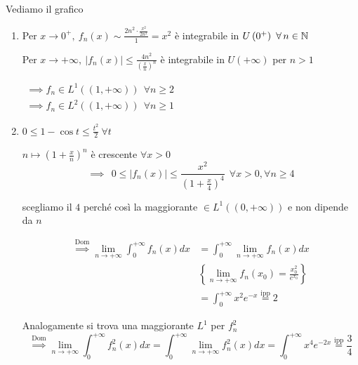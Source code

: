 Vediamo il grafico

\begin{enumerate}
\item Per $x\rightarrow 0^{+} ,\ f_{n}( x) \sim \frac{2n^{2} \cdotp \frac{x^{2}}{2n^{2}}}{1} =x^{2}$ è integrabile in $U\left( 0^{+}\right) \ \forall n\in \NN $

Per $x\rightarrow +\infty ,\ | f_{n}( x)| \leqslant \frac{4n^{2}}{\left(\frac{x}{n}\right)^{n}}$ è integrabile in $U( +\infty )$ per $n >1$

$ \begin{array}{l}
\implies f_{n} \in L^{1}(( 1,+\infty )) \ \ \forall n\geqslant 2\\
\implies f_{n} \in L^{2}(( 1,+\infty )) \ \ \forall n\geqslant 1
\end{array}$
\item $0\leqslant 1-\cos t\leqslant \frac{t^{2}}{2} \ \forall t$

$n\mapsto \left( 1+\frac{x}{n}\right)^{n}$ è crescente $\forall x >0$\begin{equation*}
\implies \ \ 0\leqslant | f_{n} (x)| \leqslant \frac{x^{2}}{\left( 1+\frac{x}{4}\right)^{4}} \ \ \forall x >0,\forall n\geqslant 4
\end{equation*}

scegliamo il $4$ perché così la maggiorante $\in L^{1}(( 0,+\infty ))$ e non dipende da $n$

\begin{equation*}
\begin{aligned}
\overset{\text{Dom}}{\implies }\lim\limits _{n\rightarrow +\infty }\int ^{+\infty }_{0} f_{n}( x) dx & =\int ^{+\infty }_{0}\lim\limits _{n\rightarrow +\infty } f_{n}( x) dx\\
 & \left\{\lim\limits _{n\rightarrow +\infty } f_{n}( x_{0}) =\frac{x^{2}_{0}}{e^{x_{0}}}\right\}\\
 & =\int ^{+\infty }_{0} x^{2} e^{-x}\overset{\text{ipp}}{=} 2
\end{aligned}
\end{equation*}

Analogamente si trova una maggiorante $L^{1}$ per $f^{2}_{n}$\begin{equation*}
\overset{\text{Dom}}{\implies }\lim\limits _{n\rightarrow +\infty }\int ^{+\infty }_{0} f^{2}_{n}( x) dx=\int ^{+\infty }_{0}\lim\limits _{n\rightarrow +\infty } f^{2}_{n}( x) dx=\int ^{+\infty }_{0} x^{4} e^{-2x}\overset{\text{ipp}}{=}\frac{3}{4}
\end{equation*}
\end{enumerate}
